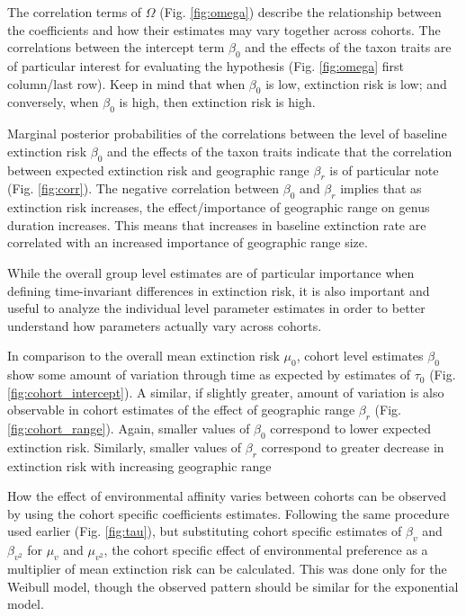 \documentclass[12pt,letterpaper]{article}
\begin{document}
The correlation terms of \(\Omega\) (Fig. \ref{fig:omega}) describe the relationship between the coefficients and how their estimates may vary together across cohorts. The correlations between the intercept term \(\beta_{0}\) and the effects of the taxon traits are of particular interest for evaluating the \citet{Jablonski1986} hypothesis (Fig. \ref{fig:omega} first column/last row). Keep in mind that when \(\beta_{0}\) is low, extinction risk is low; and conversely, when \(\beta_{0}\) is high, then extinction risk is high.

Marginal posterior probabilities of the correlations between the level of baseline extinction risk \(\beta_{0}\) and the effects of the taxon traits indicate that the correlation between expected extinction risk and geographic range \(\beta_{r}\) is of particular note (Fig. \ref{fig:corr}). The negative correlation between \(\beta_{0}\) and \(\beta_{r}\) implies that as extinction risk increases, the effect/importance of geographic range on genus duration increases. This means that increases in baseline extinction rate are correlated with an increased importance of geographic range size. %

While the overall group level estimates are of particular importance when defining time-invariant differences in extinction risk, it is also important and useful to analyze the individual level parameter estimates in order to better understand how parameters actually vary across cohorts.

In comparison to the overall mean extinction risk \(\mu_{0}\), cohort level estimates \(\beta_{0}\) show some amount of variation through time as expected by estimates of \(\tau_{0}\) (Fig. \ref{fig:cohort_intercept}). A similar, if slightly greater, amount of variation is also observable in cohort estimates of the effect of geographic range \(\beta_{r}\) (Fig. \ref{fig:cohort_range}). Again, smaller values of \(\beta_{0}\) correspond to lower expected extinction risk. Similarly, smaller values of \(\beta_{r}\) correspond to greater decrease in extinction risk with increasing geographic range 

How the effect of environmental affinity varies between cohorts can be observed by using the cohort specific coefficients estimates. Following the same procedure used earlier (Fig. \ref{fig:tau}), but substituting cohort specific estimates of \(\beta_{v}\) and \(\beta_{v^{2}}\) for \(\mu_{v}\) and \(\mu_{v^{2}}\), the cohort specific effect of environmental preference as a multiplier of mean extinction risk can be calculated. This was done only for the Weibull model, though the observed pattern should be similar for the exponential model. 
\end{document}
